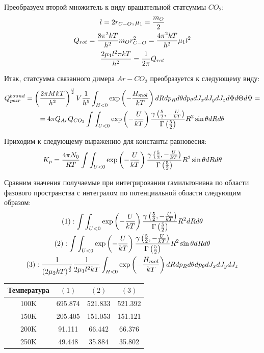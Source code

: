 \documentclass[14pt]{article}
\newcommand{\lb}{\left(}
\newcommand{\rb}{\right)}
\begin{document}
Преобразуем второй множитель к виду вращательной статсуммы $CO_2$:
\begin{gather}
	l = 2 r_{C-O}, \mu_1 = \frac{m_O}{2} \notag \\
	Q_{rot} = \frac{8 \pi^2 k T}{h^2} m_O r_{C-O}^2 = \frac{4 \pi^2 k T}{h^2} \mu_1 l^2 \notag \\
	\frac{2 \mu_1 l^2 \pi k T}{h^2} =  \frac{1}{2 \pi} Q_{rot} \notag 
\end{gather}

Итак, статсумма связанного димера $Ar-CO_2$ преобразуется к следующему виду:
\begin{gather}
	Q^{bound}_{pair} = \lb \frac{2 \pi M k T}{h^2} \rb^\frac{3}{2} V \frac{1}{h^5} \int_{H < 0} \exp \lb - \frac{H_{mol}}{kT} \rb dR dp_R d\theta dp_\theta dJ_x dJ_y dJ_z d \Phi d\Theta d\Psi = \notag \\ 
	= 4 \pi Q_{Ar} Q_{CO_2} \int \int_{U < 0} \exp \lb -\frac{U}{kT}\rb \frac{\gamma \lb \frac{5}{2}, - \frac{U}{kT} \rb}{\Gamma \lb \frac{5}{2} \rb} R^2 \sin \theta dR d\theta \notag
\end{gather}

Приходим к следующему выражению для константы равновесия:
\begin{gather}
	K_p = \frac{4 \pi N_0}{R T} \int \int_{U < 0} \exp \lb -\frac{U}{kT}\rb \frac{\gamma \lb \frac{5}{2}, - \frac{U}{kT} \rb}{\Gamma \lb \frac{5}{2} \rb} R^2 \sin \theta dR d\theta \notag 
\end{gather}

\newpage

Сравним значения получаемые при интегрировании гамильтониана по области фазового пространства с интегралом по потенциальной области следующим образом:
\begin{gather}
	(1): \int \int_{U < 0} \exp \lb -\frac{U}{kT} \rb \frac{\gamma \lb \frac{5}{2}, -\frac{U}{kT} \rb}{\Gamma \lb \frac{5}{2} \rb } R^2 dR d \theta \notag \\
	(2): \int \int_{U < 0} \exp \lb -\frac{U}{kT} \rb \frac{\gamma \lb \frac{5}{2}, -\frac{U}{kT} \rb}{\Gamma \lb \frac{5}{2} \rb } R^2 \sin \theta dR d \theta \notag \\
	(3): \frac{1}{\lb 2 \mu_2 kT \rb^{\frac{3}{2}}} \frac{1}{2 \mu_1 l^2 kT} \int_{H < 0} \exp \lb - \frac{H_{mol}}{kT} \rb dR dp_R d\theta dp_\theta dJ_x dJ_y dJ_z \notag
\end{gather}

\begin{center}
\begin{tabular}{cccc}
	\hline
	Температура & $(1)$ & $(2)$ & $(3)$ \\
	\hline
	100K & 695.874 & 521.833 & 521.392 \\
	150K & 205.405 & 151.053 & 151.121 \\
	200K & 91.111 & 66.442 &  66.376 \\
	250K & 49.448 & 35.884 & 35.802 \\
	\hline
\end{tabular} 
\end{center}
\end{document}
